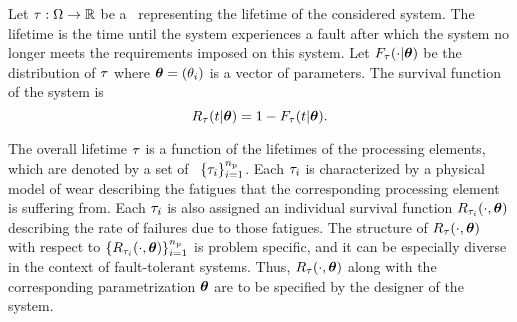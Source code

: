 Let $\tau: \Omega \to \mathbb{R}$ be a \rv\ representing the lifetime of the considered system.
The lifetime is the time until the system experiences a fault after which the system no longer meets the requirements imposed on this system.
Let $F_\tau(\cdot | \bm{\theta})$ be the distribution of $\tau$ where $\bm{\theta} = (\theta_i)$ is a vector of parameters.
The survival function of the system is
\[
  R_\tau(t | \bm{\theta}) = 1 - F_\tau(t | \bm{\theta}).
\]

The overall lifetime $\tau$ is a function of the lifetimes of the processing elements, which are denoted by a set of \rvs\ $\{ \tau_i \}_{i = 1}^{n_\text{p}}$.
Each $\tau_i$ is characterized by a physical model of wear \cite{jedec2011} describing the fatigues that the corresponding processing element is suffering from.
Each $\tau_i$ is also assigned an individual survival function $R_{\tau_i}(\cdot, \bm{\theta})$ describing the rate of failures due to those fatigues.
The structure of $R_\tau(\cdot, \bm{\theta})$ with respect to $\{ R_{\tau_i}(\cdot, \bm{\theta}) \}_{i = 1}^{n_\text{p}}$ is problem specific, and it can be especially diverse in the context of fault-tolerant systems.
Thus, $R_\tau(\cdot, \bm{\theta})$ along with the corresponding parametrization $\bm{\theta}$ are to be specified by the designer of the system.
